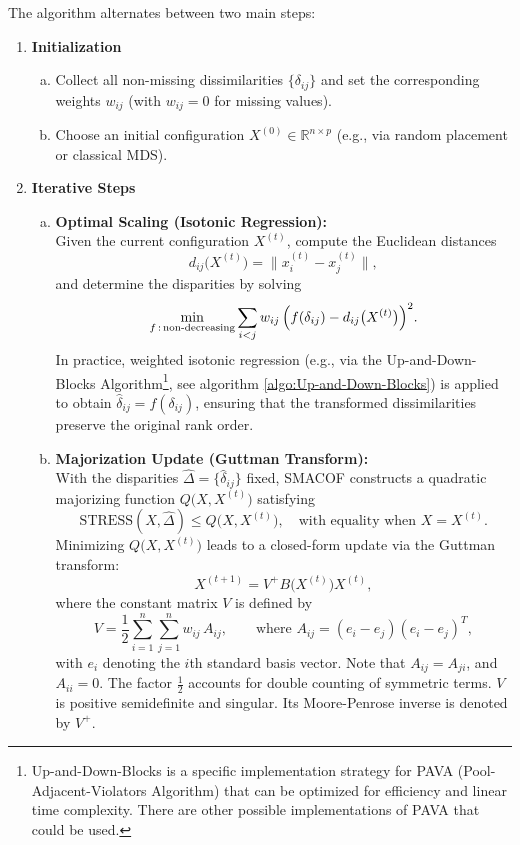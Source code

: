 The algorithm alternates between two main steps:

\begin{enumerate}
  \item \textbf{Initialization}
    \begin{enumerate}[(a)]
      \item Collect all non-missing dissimilarities $\{\delta_{ij}\}$ and set the corresponding weights $w_{ij}$ (with $w_{ij}=0$ for missing values).
      \item Choose an initial configuration $X^{(0)} \in \mathbb{R}^{n \times p}$ (e.g., via random placement or classical MDS).
    \end{enumerate}

  \item \textbf{Iterative Steps}
    \begin{enumerate}[(a)]
      \item \textbf{Optimal Scaling (Isotonic Regression):} \\
      Given the current configuration $X^{(t)}$, compute the Euclidean distances
      \[
        d_{ij}\bigl(X^{(t)}\bigr)=\|x_i^{(t)} - x_j^{(t)}\|,
      \]
      and determine the disparities by solving
      \[
        \min_{f\,:\, \text{non-decreasing}} \sum_{i<j} w_{ij}\,\Bigl(f(\delta_{ij}) - d_{ij}\bigl(X^{(t)}\bigr)\Bigr)^2.
      \]
      In practice, weighted isotonic regression (e.g., via the Up-and-Down-Blocks Algorithm\footnote{Up-and-Down-Blocks is a specific implementation strategy for PAVA (Pool-Adjacent-Violators Algorithm) that can be optimized for efficiency and linear time complexity. There are other possible implementations of PAVA that could be used.\cite{PAVA}}, see algorithm \ref{algo:Up-and-Down-Blocks}) is applied to obtain $\hat{\delta}_{ij}=f(\delta_{ij})$, ensuring that the transformed dissimilarities preserve the original rank order.
      
      \item \textbf{Majorization Update (Guttman Transform):} \\
      With the disparities $\hat{\Delta}=\{\hat{\delta}_{ij}\}$ fixed, 
      SMACOF constructs a quadratic majorizing function $Q\bigl(X, X^{(t)}\bigr)$ satisfying
      \[
        \mathrm{STRESS}(X,\hat{\Delta}) \le Q\bigl(X, X^{(t)}\bigr), \quad \text{with equality when } X = X^{(t)}.
      \]
      Minimizing $Q\bigl(X, X^{(t)}\bigr)$ leads to a closed-form update via the Guttman transform:
      \[
        X^{(t+1)} = V^{+}B\bigl(X^{(t)}\bigr)X^{(t)},
      \]
      \hspace{1em}where the constant matrix \(V\) is defined by
          \[
            V = \frac{1}{2}\sum_{i=1}^n \sum_{j=1}^n w_{ij}\,A_{ij}, \qquad \text{where }A_{ij} = (e_i - e_j)(e_i - e_j)^T,
          \]
          \hspace{1em}with \(e_i\) denoting the \(i\)th standard basis vector. Note that \(A_{ij} = A_{ji}\), and \(A_{ii} = 0\). The factor \(\frac{1}{2}\) accounts for double counting of symmetric terms. \(V\) is positive semidefinite and singular. Its Moore-Penrose inverse is denoted by \(V^{+}\).\\


\end{enumerate}
\end{enumerate}
